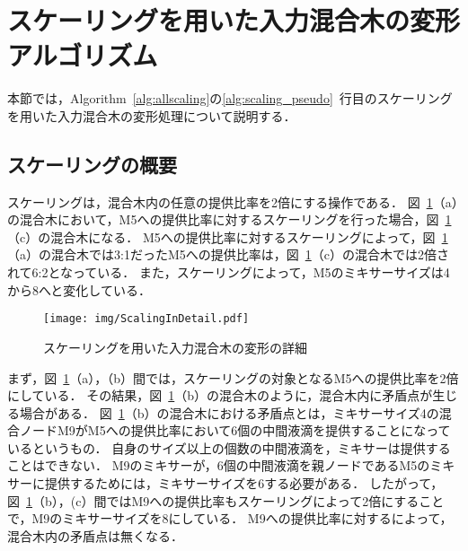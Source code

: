 \section{スケーリングを用いた入力混合木の変形アルゴリズム}
本節では，Algorithm~\ref{alg:allscaling}の\ref{alg:scaling_pseudo}~行目のスケーリングを用いた入力混合木の変形処理について説明する．
\subsection{スケーリングの概要}\label{sec:ScalingAbout}
スケーリングは，混合木内の任意の提供比率を2倍にする操作である．
図~\ref{fig:ScalingInDetail}（a）の混合木において，M5への提供比率に対するスケーリングを行った場合，図~\ref{fig:ScalingInDetail}（c）の混合木になる．
M5への提供比率に対するスケーリングによって，図~\ref{fig:ScalingInDetail}（a）の混合木では3:1だったM5への提供比率は，図~\ref{fig:ScalingInDetail}（c）の混合木では2倍されて6:2となっている．
また，スケーリングによって，M5のミキサーサイズは4から8へと変化している．


\begin{figure}[tbp]
 \centering\texttt{[image: img/ScalingInDetail.pdf]}
 \caption{スケーリングを用いた入力混合木の変形の詳細}\label{fig:ScalingInDetail}
\end{figure}

まず，図~\ref{fig:ScalingInDetail}（a），（b）間では，スケーリングの対象となるM5への提供比率を2倍にしている．
その結果，図~\ref{fig:ScalingInDetail}（b）の混合木のように，混合木内に矛盾点が生じる場合がある．
図~\ref{fig:ScalingInDetail}（b）の混合木における矛盾点とは，ミキサーサイズ4の混合ノードM9がM5への提供比率において6個の中間液滴を提供することになっているというもの．
自身のサイズ以上の個数の中間液滴を，ミキサーは提供することはできない．
M9のミキサーが，6個の中間液滴を親ノードであるM5のミキサーに提供するためには，ミキサーサイズを6する必要がある．
したがって，図~\ref{fig:ScalingInDetail}（b），(c）間ではM9への提供比率もスケーリングによって2倍にすることで，M9のミキサーサイズを8にしている．
M9への提供比率に対するによって，混合木内の矛盾点は無くなる．

